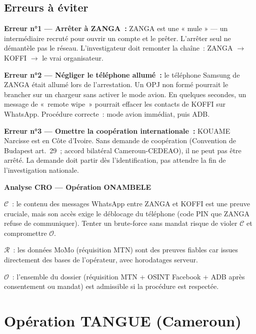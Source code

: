 \subsection{Erreurs à éviter}

\begin{boxalert}
\textbf{Erreur n°1 --- Arrêter à ZANGA~:} ZANGA est une « mule » --- un
intermédiaire recruté pour ouvrir un compte et le prêter. L'arrêter seul
ne démantèle pas le réseau. L'investigateur doit remonter la chaîne~:
ZANGA $\to$ KOFFI $\to$ le vrai organisateur.

\textbf{Erreur n°2 --- Négliger le téléphone allumé~:} le téléphone
Samsung de ZANGA était allumé lors de l'arrestation. Un OPJ non formé
pourrait le brancher sur un chargeur sans activer le mode avion. En
quelques secondes, un message de «~remote wipe~» pourrait effacer les
contacts de KOFFI sur WhatsApp. Procédure correcte~: mode avion
immédiat, puis ADB.

\textbf{Erreur n°3 --- Omettre la coopération internationale~:}
KOUAME Narcisse est en Côte d'Ivoire. Sans demande de coopération
(Convention de Budapest art.~29~; accord bilatéral Cameroun-CEDEAO),
il ne peut pas être arrêté. La demande doit partir dès l'identification,
pas attendre la fin de l'investigation nationale.
\end{boxalert}

\begin{boxCRO}
\textbf{Analyse CRO --- Opération ONAMBELE}

$\mathcal{C}$~: le contenu des messages WhatsApp entre ZANGA et KOFFI
est une preuve cruciale, mais son accès exige le déblocage du téléphone
(code PIN que ZANGA refuse de communiquer). Tenter un brute-force sans
mandat risque de violer $\mathcal{C}$ et compromettre $\mathcal{O}$.

$\mathcal{R}$~: les données MoMo (réquisition MTN) sont des preuves
fiables car issues directement des bases de l'opérateur, avec horodatages
serveur.

$\mathcal{O}$~: l'ensemble du dossier (réquisition MTN + OSINT Facebook
+ ADB après consentement ou mandat) est admissible si la procédure est
respectée.

\end{boxCRO}

\section{Opération TANGUE (Cameroun)}
\label{sec:tangue}

